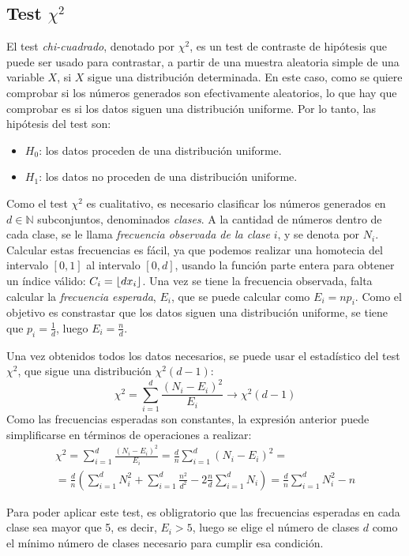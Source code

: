 \subsection{Test $\chi^2$}

El test \textit{chi-cuadrado}, denotado por $\chi^2$, es un test de contraste de hipótesis que puede ser usado para contrastar, a partir de una muestra aleatoria simple de una variable $X$, si $X$ sigue una distribución determinada. En este caso, como se quiere comprobar si los números generados son efectivamente aleatorios, lo que hay que comprobar es si los datos siguen una distribución uniforme. Por lo tanto, las hipótesis del test son:
\begin{itemize}
\item $H_0$: los datos proceden de una distribución uniforme.
\item $H_1$: los datos no proceden de una distribución uniforme.
\end{itemize}
Como el test $\chi^2$ es cualitativo, es necesario clasificar los números generados en $d\in\mathbb{N}$ subconjuntos, denominados \textit{clases}. A la cantidad de números dentro de cada clase, se le llama \textit{frecuencia observada de la clase} $i$, y se denota por $N_i$. Calcular estas frecuencias es fácil, ya que podemos realizar una homotecia del intervalo $[0,1]$ al intervalo $[0,d]$, usando la función parte entera para obtener un índice válido: $C_i=\left\lfloor d x_i \right\rfloor$. Una vez se tiene la frecuencia observada, falta calcular la \textit{frecuencia esperada}, $E_i$, que se puede calcular como $E_i=np_i$. Como el objetivo es constrastar que los datos siguen una distribución uniforme, se tiene que $p_i=\frac{1}{d}$, luego $E_i=\frac{n}{d}$. 

Una vez obtenidos todos los datos necesarios, se puede usar el estadístico del test $\chi^2$, que sigue una distribución $\chi^2(d-1)$:
\[
\chi^2=\sum_{i=1}^d\frac{(N_i-E_i)^2}{E_i} \longrightarrow \chi^2(d-1)
\]
Como las frecuencias esperadas son constantes, la expresión anterior puede simplificarse en términos de operaciones a realizar:
\begin{multline}
\chi^2=\sum_{i=1}^d\frac{(N_i-E_i)^2}{E_i}=\frac{d}{n}\sum_{i=1}^d(N_i-E_i)^2= \\
=\frac{d}{n}\left(\sum_{i=1}^dN_i^2+\sum_{i=1}^d\frac{n^2}{d^2}-2\frac{n}{d}\sum_{i=1}^dN_i\right)=\frac{d}{n}\sum_{i=1}^dN_i^2-n
\end{multline}

Para poder aplicar este test, es obligratorio que las frecuencias esperadas en cada clase sea mayor que 5, es decir, $E_i>5$, luego se elige el número de clases $d$ como el mínimo número de clases necesario para cumplir esa condición.

